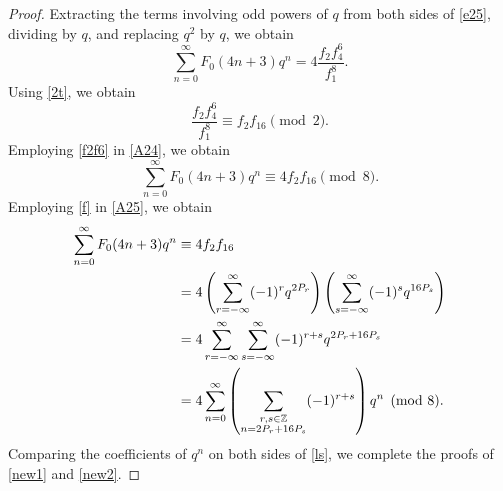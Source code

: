\documentclass[12pt]{article}
\numberwithin{equation}{section}
\theoremstyle{definition}
\theoremstyle{remark}
\numberwithin{equation}{section}
\begin{document}
\begin{proof}
Extracting the terms involving odd powers of $q$ from both sides of \eqref{e25},  dividing by $q$, and replacing $q^2$ by $q$, we obtain
\begin{equation}\label{A24}
\sum_{n=0}^{\infty}F_0(4n+3)q^n
=
4\dfrac{f_2f_4^6}{f_1^8}.
\end{equation}
Using \eqref{2t}, we obtain 
\begin{equation}\label{f2f6}
\dfrac{f_2f_4^6}{f_1^8}\equiv f_2 f_{16}\pmod 2.
\end{equation}
Employing \eqref{f2f6} in \eqref{A24}, we obtain 
\begin{equation}\label{A25}
\sum_{n=0}^{\infty}F_0(4n+3)q^n
\equiv4f_2f_{16}\pmod{8}.
\end{equation}
Employing \eqref{f} in \eqref{A25}, we obtain
\begin{align}
\sum_{n=0}^{\infty}F_0(4n+3)q^n
&\equiv4f_2f_{16}\notag\\
&=
4\left(\sum_{r=-\infty}^{\infty}(-1)^rq^{2P_r}\right)
\left(\sum_{s=-\infty}^{\infty}(-1)^sq^{16P_s}\right)
\notag\\
&=
4\sum_{r=-\infty}^{\infty}
\sum_{s=-\infty}^{\infty}
(-1)^{r+s}q^{2P_r+16P_s}
\notag\\
&\label{ls}=
4\sum_{n=0}^{\infty}
\left(
\sum_{\substack{r,s\in\mathbb{Z}\\ n=2P_r+16P_s}}
(-1)^{r+s}
\right)q^n\pmod 8.
\end{align}
Comparing the coefficients of $q^n$ on both sides of \eqref{ls},  we complete the proofs of \eqref{new1} and \eqref{new2}.
\end{proof}
\end{document}

